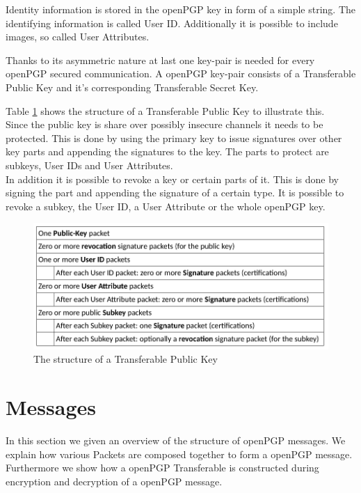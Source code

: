 Identity information is stored in the openPGP key in form of a simple string. The identifying information is called User ID. Additionally it is possible to include images, so called User Attributes.

Thanks to its asymmetric nature at last one key-pair is needed for every openPGP secured communication. A openPGP key-pair consists of a Transferable Public Key and it's corresponding Transferable Secret Key. 

Table \ref{fig:transferable-key} shows the structure of a Transferable Public Key to illustrate this. \\

Since the public key is share over possibly insecure channels it needs to be protected. This is done by using the primary key to issue signatures over other key parts and appending the signatures to the key. The parts to protect are subkeys, User IDs and User Attributes. \\


In addition it is possible to revoke a key or certain parts of it. This is done by signing the part and appending the signature of a certain type. It is possible to revoke a subkey, the User ID, a User Attribute or the whole openPGP key.

\begin{figure}[h]
	\centering
	\includegraphics[width=1\linewidth]{figures/transferable-key.png}
	\caption{The structure of a Transferable Public Key}
	\label{fig:transferable-key}
\end{figure}

\section{Messages}

In this section we given an overview of the structure of openPGP messages. We explain how various Packets are composed together to form a openPGP message. Furthermore we show how a openPGP Transferable is constructed during encryption and decryption of a openPGP message. \\

